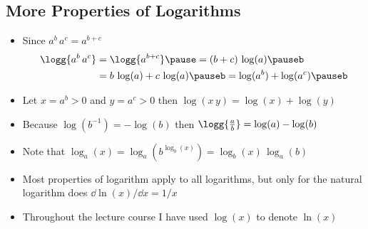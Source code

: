 \begin{slide}
  \section[-1]{More Properties of Logarithms}

\begin{PauseHighLight}
  \begin{itemize}
  \item Since $a^b \, a^c= a^{b+c}$
    \begin{align*}
      \logg{a^b \, a^c} &= \logg{a^{b+c}}\pause
                          = (b+c)\,\log(a)\pauseb \\
      &= b\,\log(a) +
      c\,\log(a)\pauseb = \log(a^b) + \log(a^c)\pauseb
    \end{align*}
  \item Let $x=a^b>0$ and $y=a^c>0$ then $\log(x\,y) =
    \log(x)+\log(y)$\pause
  \item Because $\log(b^{-1})=-\log(b)$ then $\logg{\frac{a}{b}} =
    \log(a)-\log(b)$\pause
  \item Note that $\log_a(x) = \log_a(b^{\log_b(x)}) = \log_b(x) \, \log_a(b)$\pause
  \item Most properties of logarithm apply to all logarithms, but only
    for the natural logarithm does $\dd \ln(x)/\dd x = 1/x$\pause
 \item Throughout the lecture course I have used $\log(x)$ to denote
    $\ln(x)$\pause
  \end{itemize}
\end{PauseHighLight}

\end{slide}
